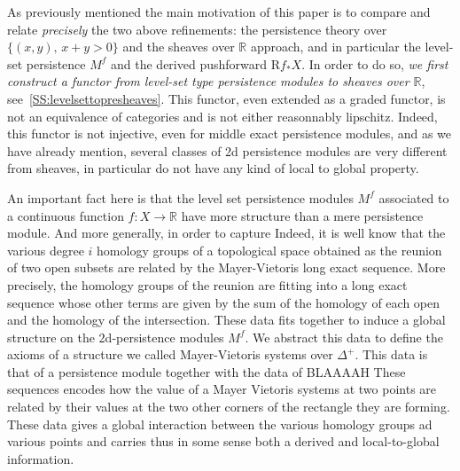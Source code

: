 \documentclass[a4paper, english, 11pt]{article}
\newcommand{\0}{\vec{0}}
\newcommand{\R}[0]{\mathbb{R}}
\newcommand{\Rr}[0]{\text{R}}
\begin{document}
\medskip 

As previously mentioned the main motivation of this paper is to compare and relate \emph{precisely} the two above refinements: the persistence theory over $\{(x,y),\, x+y>0\}$ and the sheaves over $\R$ approach, and in particular the level-set persistence $M^f$ and  the derived pushforward $\Rr f_*X$. 
In order to do so, \emph{we first construct a functor from level-set type persistence modules to sheaves over $\R$}, see~\ref{SS:levelsettopresheaves}. This functor, even extended as  a graded functor, is not an equivalence of categories and is not either reasonnably lipschitz. Indeed, this functor is not injective, even for middle exact persistence modules, and as we have already mention, several classes of 2d persistence modules are very different from sheaves, in particular do not have any kind of local to global property. 

\smallskip

An important fact here is that the level set persistence modules $M^f$ associated to a continuous function $f:X\to \R$ have more structure than a mere persistence module. And more generally, in order to capture Indeed, it is well know that the various degree $i$ homology groups of a topological space obtained as the reunion of two open subsets  are related by the Mayer-Vietoris long exact sequence. More precisely, the homology groups of the reunion are fitting into a long exact sequence whose other terms are given by the sum of the homology of each open and the homology of the intersection. These data fits together to induce a global structure on the 2d-persistence modules $M^f$. We abstract this data to define the axioms of a structure we called Mayer-Vietoris systems over $\Delta^+$. 
This data is that of a persistence module together with the data of BLAAAAH 
These sequences encodes how the value of a Mayer Vietoris systems at two points are related by their values at the two other corners of the rectangle they are forming. 
These data gives a global interaction between the various homology groups ad various points and carries thus in some sense both a derived and local-to-global information.

\smallskip 
\end{document}

